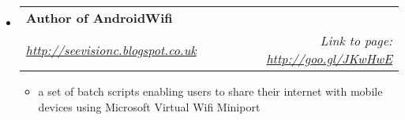 \documentclass[letterpaper,11pt]{article}
\makeatletter
\newcommand{\resitem}[1]{\item #1 \vspace{-2pt}}
\newcommand{\ressubheading}[4]{
\begin{tabular*}{6.5in}{l@{\extracolsep{\fill}}r}
		\textbf{#1} & #2 \\
		\textit{#3} & \textit{#4} \\
\end{tabular*}\vspace{-6pt}}
\makeatother
\begin{document}
\begin{itemize}
		\item 
			\ressubheading{Author of AndroidWifi}{}{\href{https://github.com/masad801/OpenCVKinect}{http://seevisionc.blogspot.co.uk}}{Link to page: \href{http://goo.gl/JKwHwE}{http://goo.gl/JKwHwE}}
				{ \footnotesize
				\begin{itemize}
					\resitem{a set of batch scripts enabling users to share their internet with mobile devices using Microsoft Virtual Wifi Miniport}
					
				\end{itemize}
				}
	\end{itemize}  
	
\end{document}
